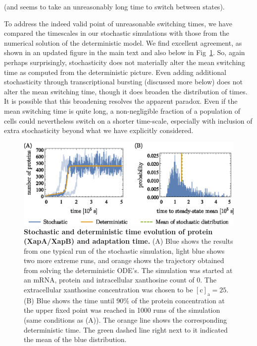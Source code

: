 \documentclass[11pt,letterpaper]{article}
\begin{document}
\begin{review}
	(and seems to take an unreasonably long time to switch between states).
\end{review}

\begin{response}
To address the indeed valid point of unreasonable switching times, we
have compared the timescales in our stochastic simulations with those from the
numerical solution of the deterministic model. We find excellent
agreement, as shown in an updated figure in the main text and also below
in Fig~\ref{adaptationtime}. So, again perhaps surprisingly,
stochasticity does not materially alter the mean switching time as
computed from the deterministic picture. Even adding additional
stochasticity through transcriptional bursting (discussed more below)
does not alter the mean switching time, though it does broaden the
distribution of times.
It is possible that this broadening resolves the apparent paradox. Even
if the mean switching time is quite long, a non-negligible fraction of a
population of cells could nevertheless switch on a shorter time-scale,
especially with inclusion of extra stochasticity beyond what we have
explicitly considered.
\end{response}

	\begin{figure}[h!]
		\centering
		\includegraphics{Fig9_evolution.eps}
		\vspace*{0.5em}
		\caption{{\bf Stochastic and deterministic time evolution of protein (XapA/XapB) and adaptation time.}
			(A) Blue shows the results from one typical run of the stochastic simulation, light blue shows two more extreme runs, and orange shows the trajectory obtained from solving the deterministic ODE's. The simulation was started
			at an mRNA, protein and intracellular xanthosine count of 0. The
			extracellular xanthosine concentration was chosen to be
			$\mathrm{[c]_a} = 25$. (B) Blue shows the time until 90\% of the protein concentration at the upper fixed point was reached in 1000 runs of the simulation (same conditions as (A)). The orange line shows the corresponding deterministic time. The green dashed line right next to it indicated the mean of the blue distribution.}
		\label{adaptationtime}
	\end{figure}
\end{document}
